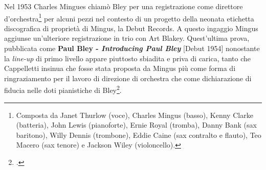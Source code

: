 Nel 1953 Charles Mingues chiamò Bley per una registrazione come direttore d'orchestra\footnote{Composta da Janet Thurlow (voce), Charles Mingus (basso), Kenny Clarke (batteria), John Lewis (pianoforte), Ernie Royal (tromba), Danny Bank (sax baritono), Willy Dennis (trombone), Eddie Caine (sax contralto e flauto), Teo Macero (sax tenore) e Jackson Wiley (violoncello).} per alcuni pezzi nel contesto di un progetto della neonata etichetta discografica di proprietà di Mingus, la Debut Records. A questo ingaggio Mingus aggiunse un'ulteriore registrazione in trio con Art Blakey. Quest'ultima prova, pubblicata come \textbf{Paul Bley - \textit{Introducing Paul Bley}} [Debut 1954] nonostante la \textit{line-up} di primo livello appare piuttosto sbiadita e priva di carica, tanto che Cappelletti insinua che fosse stata proposta da Mingus più come forma di ringraziamento per il lavoro di direzione di orchestra che come dichiarazione di fiducia nelle doti pianistiche di Bley\footcite[49]{cappelletti}.\par
